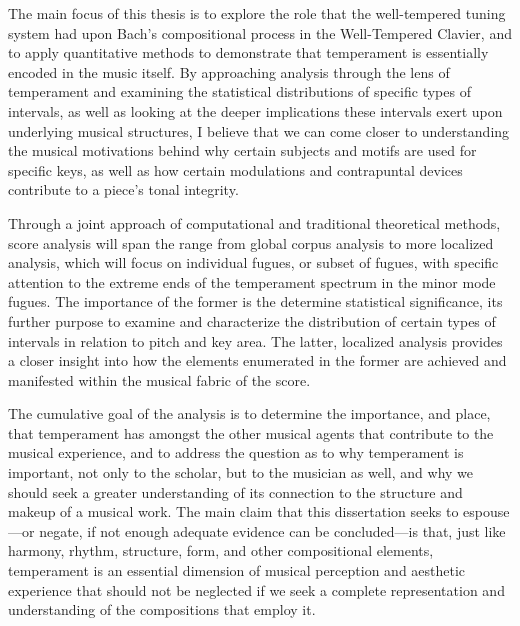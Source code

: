     
    
    

    
    The main focus of this thesis is to explore the role that the
well-tempered tuning system had upon Bach's compositional process in the
Well-Tempered Clavier, and to apply quantitative methods to demonstrate
that temperament is essentially encoded in the music itself. By
approaching analysis through the lens of temperament and examining the
statistical distributions of specific types of intervals, as well as
looking at the deeper implications these intervals exert upon underlying
musical structures, I believe that we can come closer to understanding
the musical motivations behind why certain subjects and motifs are used
for specific keys, as well as how certain modulations and contrapuntal
devices contribute to a piece's tonal integrity.

Through a joint approach of computational and traditional theoretical
methods, score analysis will span the range from global corpus analysis
to more localized analysis, which will focus on individual fugues, or
subset of fugues, with specific attention to the extreme ends of the
temperament spectrum in the minor mode fugues. The importance of the
former is the determine statistical significance, its further purpose to
examine and characterize the distribution of certain types of intervals
in relation to pitch and key area. The latter, localized analysis
provides a closer insight into how the elements enumerated in the former
are achieved and manifested within the musical fabric of the score.

The cumulative goal of the analysis is to determine the importance, and
place, that temperament has amongst the other musical agents that
contribute to the musical experience, and to address the question as to
why temperament is important, not only to the scholar, but to the
musician as well, and why we should seek a greater understanding of its
connection to the structure and makeup of a musical work. The main claim
that this dissertation seeks to espouse---or negate, if not enough
adequate evidence can be concluded---is that, just like harmony, rhythm,
structure, form, and other compositional elements, temperament is an
essential dimension of musical perception and aesthetic experience that
should not be neglected if we seek a complete representation and
understanding of the compositions that employ it.


    
    
    
